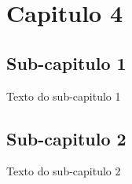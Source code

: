 
\chapter{Capitulo 4}

\section{Sub-capitulo 1}
Texto do sub-capitulo 1

\section{Sub-capitulo 2}
Texto do sub-capitulo 2